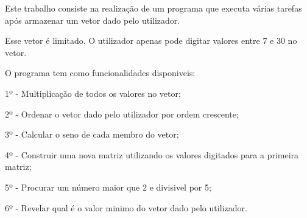 Este trabalho consiste na realização de um programa que executa várias tarefas após armazenar um vetor dado pelo utilizador.

Esse vetor é limitado. O utilizador apenas pode digitar valores entre 7 e 30 no vetor.

O programa tem como funcionalidades disponiveis\+:

1º -\/ Multiplicação de todos os valores no vetor;

2º -\/ Ordenar o vetor dado pelo utilizador por ordem crescente;

3º -\/ Calcular o seno de cada membro do vetor;

4º -\/ Construir uma nova matriz utilizando os valores digitados para a primeira matriz;

5º -\/ Procurar um número maior que 2 e divisivel por 5;

6º -\/ Revelar qual é o valor minimo do vetor dado pelo utilizador. 